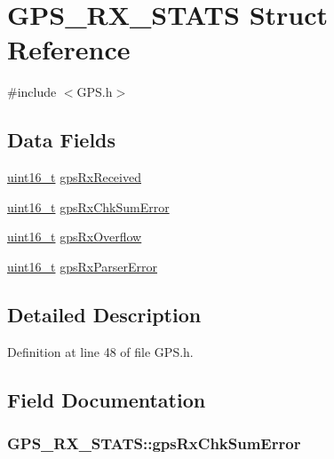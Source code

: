 \hypertarget{struct_g_p_s___r_x___s_t_a_t_s}{\section{G\-P\-S\-\_\-\-R\-X\-\_\-\-S\-T\-A\-T\-S Struct Reference}
\label{struct_g_p_s___r_x___s_t_a_t_s}
}


{\ttfamily \#include $<$G\-P\-S.\-h$>$}

\subsection*{Data Fields}
\begin{DoxyCompactItemize}
\item 
\hyperlink{stdint_8h_a273cf69d639a59973b6019625df33e30}{uint16\-\_\-t} \hyperlink{struct_g_p_s___r_x___s_t_a_t_s_a2cc140780bc89226502f3903c38c8a30}{gps\-Rx\-Received}
\item 
\hyperlink{stdint_8h_a273cf69d639a59973b6019625df33e30}{uint16\-\_\-t} \hyperlink{struct_g_p_s___r_x___s_t_a_t_s_a1a89019cb1163e32575738685ef79317}{gps\-Rx\-Chk\-Sum\-Error}
\item 
\hyperlink{stdint_8h_a273cf69d639a59973b6019625df33e30}{uint16\-\_\-t} \hyperlink{struct_g_p_s___r_x___s_t_a_t_s_a1820743f7205c836af17a100834732b4}{gps\-Rx\-Overflow}
\item 
\hyperlink{stdint_8h_a273cf69d639a59973b6019625df33e30}{uint16\-\_\-t} \hyperlink{struct_g_p_s___r_x___s_t_a_t_s_a89bf9e59acfe33d00d4a319ec4f84cd7}{gps\-Rx\-Parser\-Error}
\end{DoxyCompactItemize}


\subsection{Detailed Description}


Definition at line 48 of file G\-P\-S.\-h.



\subsection{Field Documentation}
\hypertarget{struct_g_p_s___r_x___s_t_a_t_s_a1a89019cb1163e32575738685ef79317}{
\subsubsection[{gps\-Rx\-Chk\-Sum\-Error}]{ G\-P\-S\-\_\-\-R\-X\-\_\-\-S\-T\-A\-T\-S\-::gps\-Rx\-Chk\-Sum\-Error}}\label{struct_g_p_s___r_x___s_t_a_t_s_a1a89019cb1163e32575738685ef79317}


